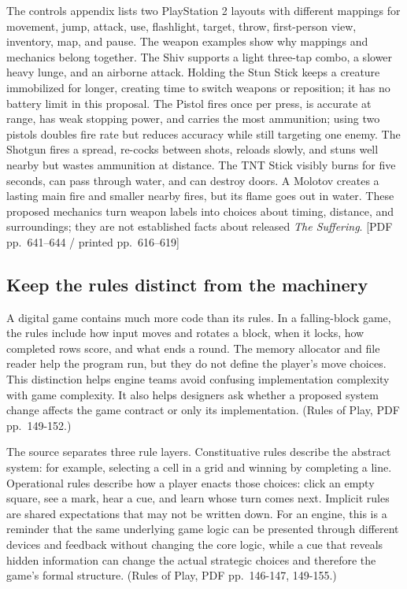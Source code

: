 The controls appendix lists two PlayStation 2 layouts with different mappings for movement, jump, attack, use, flashlight, target, throw, first-person view, inventory, map, and pause. The weapon examples show why mappings and mechanics belong together. The Shiv supports a light three-tap combo, a slower heavy lunge, and an airborne attack. Holding the Stun Stick keeps a creature immobilized for longer, creating time to switch weapons or reposition; it has no battery limit in this proposal. The Pistol fires once per press, is accurate at range, has weak stopping power, and carries the most ammunition; using two pistols doubles fire rate but reduces accuracy while still targeting one enemy. The Shotgun fires a spread, re-cocks between shots, reloads slowly, and stuns well nearby but wastes ammunition at distance. The TNT Stick visibly burns for five seconds, can pass through water, and can destroy doors. A Molotov creates a lasting main fire and smaller nearby fires, but its flame goes out in water. These proposed mechanics turn weapon labels into choices about timing, distance, and surroundings; they are not established facts about released \emph{The Suffering}. {[}PDF pp.~641--644 / printed pp.~616--619{]}

\subsection{Keep the rules distinct from the machinery}\label{05-engine-i-ch009-keep-the-rules-distinct-from-the-machinery}

A digital game contains much more code than its rules. In a falling-block game, the rules include how input moves and rotates a block, when it locks, how completed rows score, and what ends a round. The memory allocator and file reader help the program run, but they do not define the player's move choices. This distinction helps engine teams avoid confusing implementation complexity with game complexity. It also helps designers ask whether a proposed system change affects the game contract or only its implementation. (Rules of Play, PDF pp.~149-152.)

The source separates three rule layers. Constituative rules describe the abstract system: for example, selecting a cell in a grid and winning by completing a line. Operational rules describe how a player enacts those choices: click an empty square, see a mark, hear a cue, and learn whose turn comes next. Implicit rules are shared expectations that may not be written down. For an engine, this is a reminder that the same underlying game logic can be presented through different devices and feedback without changing the core logic, while a cue that reveals hidden information can change the actual strategic choices and therefore the game's formal structure. (Rules of Play, PDF pp.~146-147, 149-155.)

